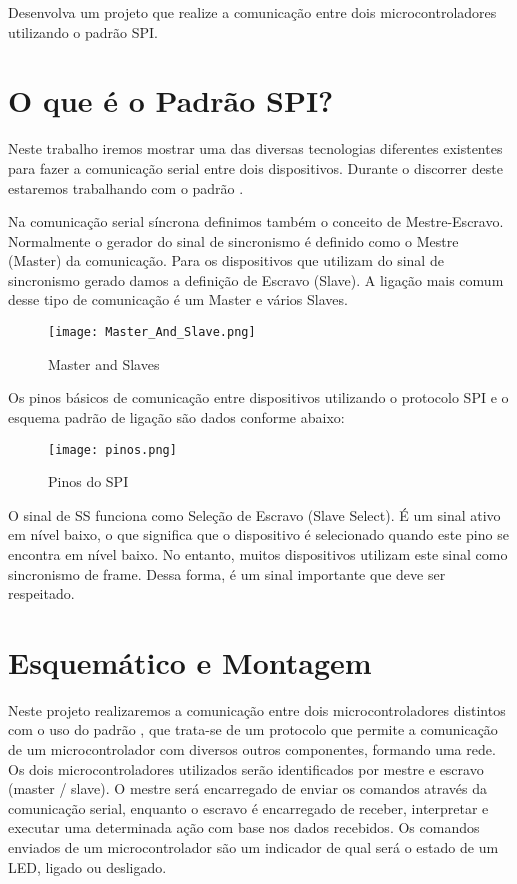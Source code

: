 Desenvolva um projeto que realize a comunicação entre dois microcontroladores utilizando o padrão SPI.

\section{O que é o Padrão SPI?}

Neste trabalho iremos mostrar uma das diversas tecnologias diferentes existentes para fazer a comunicação serial entre dois dispositivos. Durante o discorrer deste estaremos trabalhando com o padrão .

Na comunicação serial síncrona definimos também o conceito de Mestre-Escravo. Normalmente o gerador do sinal de sincronismo é definido como o Mestre (Master) da comunicação. Para os dispositivos que utilizam do sinal de sincronismo gerado damos a definição de Escravo (Slave). A ligação mais comum desse tipo de comunicação é um Master e vários Slaves.

\begin{figure}[htb]
 \caption{Master and Slaves}
 \label{fig:Master and Slaves}
 \centering
 \texttt{[image: Master\_And\_Slave.png]}
\end{figure}

Os pinos básicos de comunicação entre dispositivos utilizando o protocolo SPI e o esquema padrão de ligação são dados conforme abaixo:

\begin{figure}[htb]
 \caption{Pinos do SPI}
 \label{fig:Pinos para comunicação SPI}
 \centering
 \texttt{[image: pinos.png]}
\end{figure}

O sinal de SS funciona como Seleção de Escravo (Slave Select). É um sinal ativo em nível baixo, o que significa que o dispositivo é selecionado quando este pino se encontra em nível baixo. No entanto, muitos dispositivos utilizam este sinal como sincronismo de frame. Dessa forma, é um sinal importante que deve ser respeitado.

\section{Esquemático e Montagem}

Neste projeto realizaremos a comunicação entre dois microcontroladores distintos com o uso do padrão , que trata-se de um protocolo que permite a comunicação de um microcontrolador com diversos outros componentes, formando uma rede. Os dois microcontroladores utilizados serão identificados por mestre e escravo (master / slave). O mestre será encarregado de enviar os comandos através da comunicação serial, enquanto o escravo é encarregado de receber, interpretar e executar uma determinada ação com base nos dados recebidos. Os comandos enviados de um microcontrolador são um indicador de qual será o estado de um LED, ligado ou desligado.

